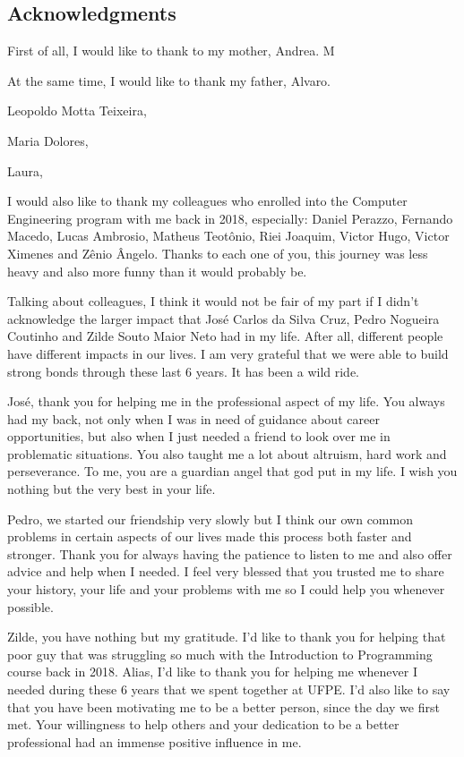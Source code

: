\thispagestyle{empty}
\begin{spacing}{1.0}
\chapter*{Acknowledgments}

First of all, I would like to thank to my mother, Andrea. M

At the same time, I would like to thank my father, Alvaro.

Leopoldo Motta Teixeira,

Maria Dolores,

Laura,

I would also like to thank my colleagues who enrolled into the Computer Engineering program with me back in 2018, especially: Daniel Perazzo, Fernando Macedo, Lucas Ambrosio, Matheus Teotônio, Riei Joaquim, Victor Hugo, Victor Ximenes and Zênio Ângelo. Thanks to each one of you, this journey was less heavy and also more funny than it would probably be.

Talking about colleagues, I think it would not be fair of my part if I didn't acknowledge the larger impact that José Carlos da Silva Cruz, Pedro Nogueira Coutinho and Zilde Souto Maior Neto had in my life. After all, different people have different impacts in our lives. I am very grateful that we were able to build strong bonds through these last 6 years. It has been a wild ride.

José, thank you for helping me in the professional aspect of my life. You always had my back, not only when I was in need of guidance about career opportunities, but also when I just needed a friend to look over me in problematic situations. You also taught me a lot about altruism, hard work and perseverance. To me, you are a guardian angel that god put in my life. I wish you nothing but the very best in your life.

Pedro, we started our friendship very slowly but I think our own common problems in certain aspects of our lives made this process both faster and stronger. Thank you for always having the patience to listen to me and also offer advice and help when I needed. I feel very blessed that you trusted me to share your history, your life and your problems with me so I could help you whenever possible.

Zilde, you have nothing but my gratitude. I'd like to thank you for helping that poor guy that was struggling so much with the Introduction to Programming course back in 2018. Alias, I'd like to thank you for helping me whenever I needed during these 6 years that we spent together at UFPE. I'd also like to say that you have been motivating me to be a better person, since the day we first met. Your willingness to help others and your dedication to be a better professional had an immense positive influence in me.


\end{spacing}
